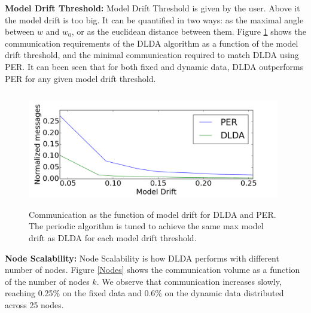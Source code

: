 \noindent\textbf{Model Drift Threshold:} Model Drift Threshold is given by the user. Above it the model drift is too big. It can be quantified in two ways: as the maximal angle between $w$ and $w_0$, or as the euclidean distance between them. 
Figure \ref{PERvsDLDAoverError} shows the communication requirements of the DLDA algorithm as a function of the model drift threshold, and the minimal communication required to match DLDA using PER.	
It can been seen that for both fixed and dynamic data, DLDA outperforms PER for
any given model drift threshold.
 \begin{figure}
	\centering
	\includegraphics[width=110mm, height=5cm]{graphics/LDA/onlyDrift.png}
	\caption{Communication as the function of model drift for DLDA and PER. The
	periodic algorithm is tuned to achieve the same max model drift as DLDA
	for each model drift threshold.}
	\label{PERvsDLDAoverError}
\end{figure}

	
\noindent\textbf{Node Scalability:}
Node Scalability is how DLDA performs with different number of nodes.
Figure \ref{Nodes} shows the communication volume as a function of the number of nodes $k$.
We observe that communication increases slowly, reaching 0.25\% on the fixed
data and 0.6\% on the dynamic data distributed across 25 nodes.

